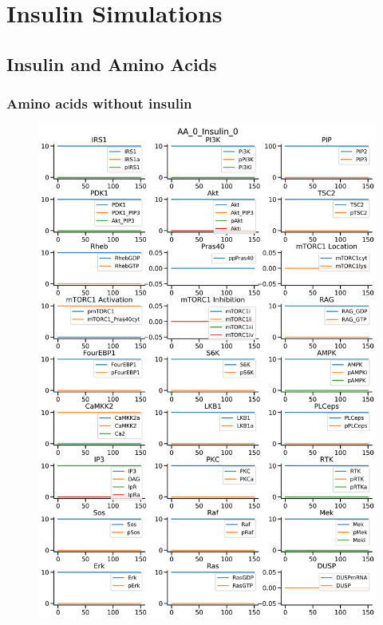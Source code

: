 \documentclass{beamer}
\begin{document}
\section{Insulin Simulations} %
\subsection{Insulin and Amino Acids} %
\begin{frame}
\frametitle{Amino acids without insulin}
\begin{figure}
    \begin{minipage}{0.45\textwidth}
        \centering
        \includegraphics[width=\textwidth]{../simulations/ExtendedPI3KModel/validations/AAWithInsulin/AA_0_Insulin_0-0.png}

\end{minipage}
\end{figure}
\end{frame}
\end{document}
